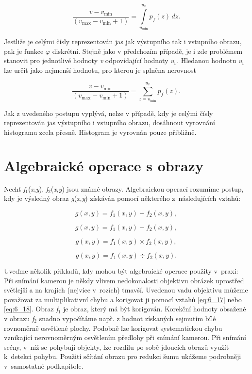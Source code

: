 \begin{equation} \label{eq:6_13}
    \frac{v - v_{\min}}{(v_{\max} - v_{\min} + 1)} = \int\limits_{u_{\min}}^{u_v} p_f(z)\,dz.
\end{equation}

\noindent Jestliže je celými čísly reprezentován jas jak výstupního tak i vstupního obrazu, pak je funkce $\varphi$ diskrétní. Stejně jako v předchozím případě, je i zde problémem stanovit pro jednotlivé hodnoty \textit{v} odpovídající hodnoty \textit{u}$_v$. Hledanou hodnotu \textit{u}$_v$ lze určit jako nejmenší hodnotu, pro kterou je splněna nerovnost

\begin{equation} \label{eq:6_14}
    \frac{v - v_{\min}}{(v_{\max} - v_{\min} + 1)} = \sum\limits_{z=u_{\min}}^{u_v} p_f(z).
\end{equation}

Jak z uvedeného postupu vyplývá, nelze v případě, kdy je celými čísly reprezentován jas výstupního i vstupního obrazu, dosáhnout vyrovnání histogramu zcela přesně. Histogram je vyrovnán pouze přibližně.

\section*{Algebraické operace s obrazy}

Nechť \textit{f}$_1$(\textit{x},\textit{y}), \textit{f}$_2$(\textit{x},\textit{y}) jsou známé obrazy. Algebraickou operací rozumíme postup, kdy je výsledný obraz \textit{g}(\textit{x},\textit{y}) získáván pomocí některého z~následujících vztahů:

\begin{equation} \label{eq:6_15}
    g(x, y) = f_1(x, y) + f_2(x, y),
\end{equation}

\begin{equation} \label{eq:6_16}
    g(x, y) = f_1(x, y) - f_2(x, y),
\end{equation}

\begin{equation} \label{eq:6_17}
    g(x, y) = f_1(x, y) \times f_2(x, y),
\end{equation}

\begin{equation} \label{eq:6_18}
    g(x, y) = f_1(x, y) \div f_2(x, y).
\end{equation}

Uveďme několik příkladů, kdy mohou být algebraické operace použity v~praxi: Při snímání kamerou je někdy vlivem nedokonalosti objektivu obrázek uprostřed světlejší a na krajích (nejvíce v~rozích) tmavší. Uvedenou vadu objektivu můžeme považovat za multiplikativní chybu a korigovat ji pomocí vztahů \eqref{eq:6_17} nebo \eqref{eq:6_18}. Obraz \textit{f}$_1$ je obraz, který má být korigován. Korekční hodnoty obsažené v obrazu \textit{f}$_2$ snadno vypočítáme např. z hodnot získaných sejmutím bílé rovnoměrně osvětlené plochy. Podobně lze korigovat systematickou chybu vznikající nerovnoměrným osvětlením předlohy při snímání kamerou. Při snímání scény, v~níž se pohybují objekty, lze rozdílu po sobě jdoucích obrazů využít k~detekci pohybu. Použití sčítání obrazu pro redukci šumu ukážeme podrobněji v~samostatné podkapitole.

